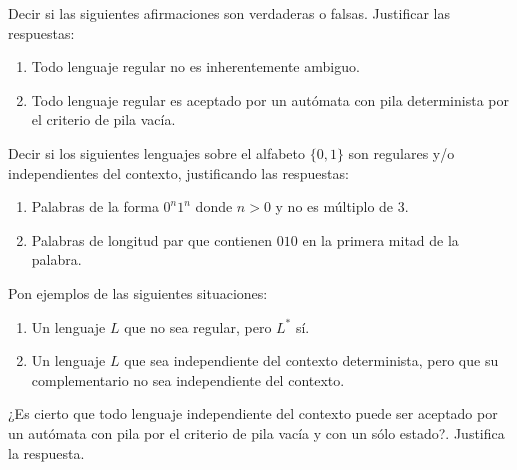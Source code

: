 \documentclass[12pt]{article}
\begin{document}
\begin{ejercicio}[1.25 puntos]
    Decir si las siguientes afirmaciones son verdaderas o falsas. Justificar las respuestas:
    \begin{enumerate}
        \item Todo lenguaje regular no es inherentemente ambiguo.
        \item Todo lenguaje regular es aceptado por un autómata con pila determinista por el criterio de pila vacía.
    \end{enumerate}
\end{ejercicio}

\begin{ejercicio}[1.25 puntos]
    Decir si los siguientes lenguajes sobre el alfabeto $\{0, 1\}$ son regulares y/o independientes del contexto, justificando las respuestas:
    \begin{enumerate}
        \item Palabras de la forma $0^n1^n$ donde $n > 0$ y no es múltiplo de $3$.
        \item Palabras de longitud par que contienen $010$ en la primera mitad de la palabra.
    \end{enumerate}
\end{ejercicio}

\begin{ejercicio}[1.25 puntos]
    Pon ejemplos de las siguientes situaciones:
    \begin{enumerate}
        \item Un lenguaje $L$ que no sea regular, pero $L^*$ sí.
        \item Un lenguaje $L$ que sea independiente del contexto determinista, pero que su complementario no sea independiente del contexto.
    \end{enumerate}
\end{ejercicio}

\begin{ejercicio}[1.25 puntos]
    ¿Es cierto que todo lenguaje independiente del contexto puede ser aceptado por un autómata con pila por el criterio de pila vacía y con un sólo estado?. Justifica la respuesta.
\end{ejercicio}

\newpage
\setcounter{ejercicio}{0}
\end{document}
